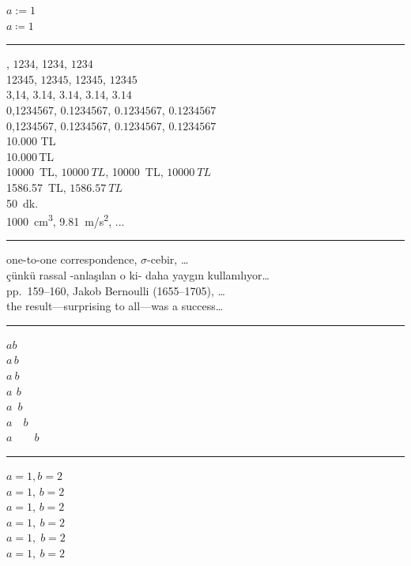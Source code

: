 \documentclass{article}
\begin{document}

\noindent
$a := 1$ \\
$a \coloneqq 1$ %

\bigskip
\hrule
\bigskip

, $1234$, \num{1234}, $\num{1234}$ \\
12345, $12345$, \num{12345}, $\num{12345}$ \\
3,14, \num{3,14}, $\num{3,14}$, \num{3.14}, $\num{3.14}$ \\ %
0,1234567, \num{0,1234567}, $\num{0,1234567}$, $\num{0.1234567}$ \\
\begingroup
{}
0,1234567, \num{0,1234567}, $\num{0,1234567}$, $\num{0.1234567}$ \\
\endgroup
10.000 TL \\
10.000\,TL \\
\qty{10000}{TL}, $\qty{10000}{TL}$, \qty{10 000}{TL}, $\qty{10 000}{TL}$ \\
\qty{1586,57}{TL}, $\qty{1586,57}{TL}$ \\
\qty{50}{dk}. \\ %
\qty{1000}{cm^3}, \qty{9,81}{m/s^2}, ...

\bigskip
\hrule
\bigskip

\noindent
one-to-one correspondence, $\sigma$-cebir, \dots \\
çünkü rassal -anlaşılan o ki- daha yaygın kullanılıyor\dots \\
pp.~159--160, Jakob Bernoulli (1655--1705), \dots \\
the result---surprising to all---was a success\dots

\bigskip
\hrule
\bigskip

\noindent
$ab$ \\
$a\, b$ \\
$a\ b$ \\
$a\ \, b$ \\
$a\enspace b$ \\ %
$a\quad b$ \\ %
$a\qquad b$ %

\bigskip
\hrule
\bigskip

\noindent
$a = 1, b = 2$ \\
$a = 1,\, b = 2$ \\
$a = 1$, $b = 2$ \\
$a = 1,\: b = 2$ \\
$a = 1,\; b = 2$ \\
$a = 1,\ b = 2$
\end{document}
